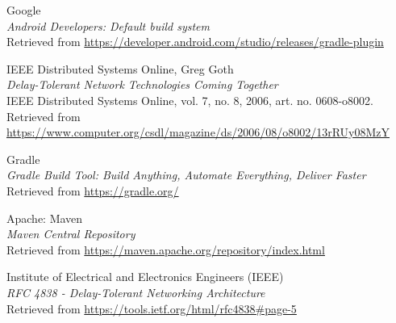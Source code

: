 \documentclass[11pt]{article}
\begin{document}
\begin{thebibliography}{9}
\begin{flushleft}
	Google \\
	\textit{Android Developers: Default build system} \\
	Retrieved from \url{https://developer.android.com/studio/releases/gradle-plugin}
\end{flushleft}

\begin{flushleft}
	IEEE Distributed Systems Online, Greg Goth \\
	\textit{Delay-Tolerant Network Technologies Coming Together} \\
	 IEEE Distributed Systems Online, vol. 7, no. 8, 2006, art. no. 0608-o8002.\\
	Retrieved from \url{https://www.computer.org/csdl/magazine/ds/2006/08/o8002/13rRUy08MzY}
\end{flushleft}

\begin{flushleft}
	Gradle \\
	\textit{Gradle Build Tool: Build Anything, Automate Everything, Deliver Faster} \\
	Retrieved from \url{https://gradle.org/}
\end{flushleft}

\begin{flushleft}
	Apache: Maven \\
	\textit{Maven Central Repository} \\
	Retrieved from \url{https://maven.apache.org/repository/index.html}
\end{flushleft}


\begin{flushleft}
	Institute of Electrical and Electronics Engineers (IEEE) \\
	\textit{RFC 4838 - Delay-Tolerant Networking Architecture} \\
	Retrieved from \url{https://tools.ietf.org/html/rfc4838#page-5}
\end{flushleft}



\end{thebibliography}
\end{document}
